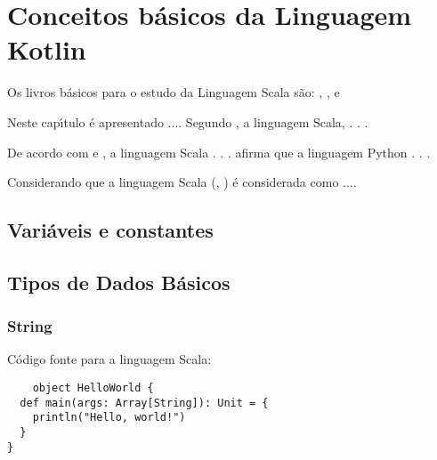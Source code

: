 

\chapter{ Conceitos b\'{a}sicos da Linguagem Kotlin}

Os livros b\'{a}sicos para o estudo da Linguagem Scala s\~{a}o: \cite{Whaling2020}, \cite{Wampler2021}, \cite{Hunt2018} e \cite{Upadhyaya2019}

Neste cap\'{\i}tulo \'{e} apresentado ....  Segundo \cite{Hunt2018}, a linguagem Scala,  . . .

De acordo com \cite{Sebesta2018} e \cite{roy04}, a linguagem Scala . . . \cite{Sebesta2018} afirma que a linguagem Python . . .

Considerando que a linguagem Scala (\cite{Whaling2020}, \cite{Upadhyaya2019}) \'{e} considerada como ....

    \section{Vari\'{a}veis e constantes}


    \section{Tipos de Dados B\'{a}sicos}

            \subsection{String}

    C\'{o}digo fonte para a linguagem Scala:
    \begin{lstlisting}
    object HelloWorld {
  def main(args: Array[String]): Unit = {
    println("Hello, world!")
  }
}
    \end{lstlisting}

